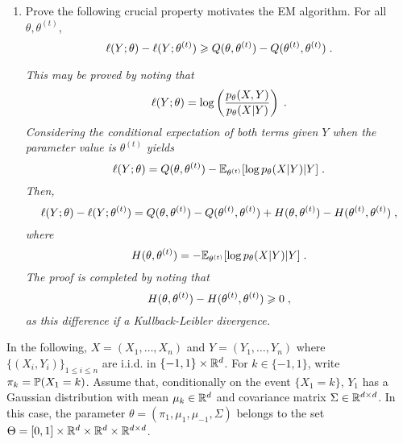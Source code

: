 \begin{enumerate}
\item Prove the following crucial property motivates the EM algorithm.  For all $\theta,\theta^{(t)}$,
$$
\ell(Y;\theta) - \ell(Y;\theta^{(t)}) \geqslant Q(\theta,\theta^{(t)})-Q(\theta^{(t)},\theta^{(t)})\;.
$$


\vspace{.2cm}

{\em
This may be proved by noting that
$$
\ell(Y;\theta) = \log \left(\frac{p_{\theta}(X,Y)}{p_{\theta}(X|Y)}\right)\;.
$$
Considering the conditional expectation of both terms given $Y$ when the parameter value is $\theta^{(t)}$ yields
$$
\ell(Y;\theta) = Q(\theta,\theta^{(t)}) - \mathbb{E}_{\theta^{(t)}}[\log p_{\theta}(X|Y)|Y]\;.
$$
Then,
$$
\ell(Y;\theta) - \ell(Y;\theta^{(t)}) = Q(\theta,\theta^{(t)})-Q(\theta^{(t)},\theta^{(t)}) + H(\theta,\theta^{(t)}) - H(\theta^{(t)},\theta^{(t)})\;,
$$
where
$$
H(\theta,\theta^{(t)}) = - \mathbb{E}_{\theta^{(t)}}[\log p_{\theta}(X|Y)|Y]\;.
$$
The proof is completed by noting that
$$
H(\theta,\theta^{(t)}) - H(\theta^{(t)},\theta^{(t)})\geqslant 0\;,
$$
as this difference if a Kullback-Leibler divergence. 
}
\end{enumerate}
In the following, $X = (X_1,\ldots,X_n)$ and $Y = (Y_1,\ldots,Y_n)$ where $\{(X_i,Y_i)\}_{1\leqslant i\leqslant n}$  are i.i.d. in $\{-1,1\} \times \mathbb{R}^d$. For $k\in\{-1,1\}$, write $\pi_k = \mathbb{P}(X_1 = k)$. Assume that, conditionally on the event $\{X_1 = k\}$, $Y_1$ has a Gaussian distribution with mean $\mu_k \in\mathbb{R}^d$ and covariance matrix $\Sigma\in \mathbb{R}^{d\times d}$. In this case, the parameter $\theta=(\pi_1, \mu_1,\mu_{-1}, \Sigma)$ belongs to the set $\Theta= [0,1] \times \mathbb{R}^d \times \mathbb{R}^d \times \mathbb{R}^{d \times d}$.
